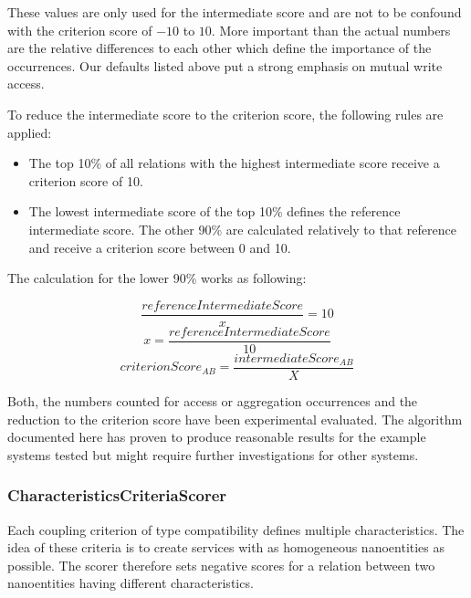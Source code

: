 These values are only used for the intermediate score and are not to be confound with the criterion score of $-10$ to $10$. More important than the actual numbers are the relative differences to each other which define the importance of the occurrences. Our defaults listed above put a strong emphasis on mutual write access. 

To reduce the intermediate score to the criterion score, the following rules are applied:

\begin{itemize}
	\item The top 10\% of all relations with the highest intermediate score receive a criterion score of 10.
	\item The lowest intermediate score of the top 10\% defines the reference intermediate score. The other 90\% are calculated relatively to that reference and receive a criterion score between 0 and 10.
\end{itemize}

The calculation for the lower 90\% works as following:


\begin{equation}
\frac{referenceIntermediateScore}{x} = 10
\end{equation}
\begin{equation}
x = \frac{referenceIntermediateScore}{10}
\end{equation}
\begin{equation}
criterionScore_{AB} = \frac{intermediateScore_{AB}}{X}
\end{equation}

Both, the numbers counted for access or aggregation occurrences and the reduction to the criterion score have been experimental evaluated. The algorithm documented here has proven to produce reasonable results for the example systems tested but might require further investigations for other systems. 

\subsubsection{CharacteristicsCriteriaScorer}

Each coupling criterion of type compatibility defines multiple characteristics. The idea of these criteria is to create services with as homogeneous nanoentities as possible. The scorer therefore sets negative scores for a relation between two nanoentities having different characteristics. 

